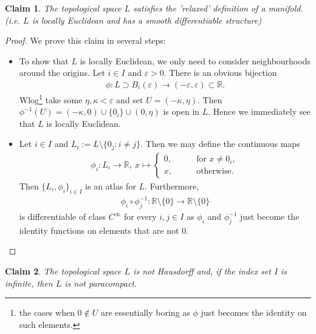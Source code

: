 \documentclass[a4paper, 12pt]{article}
\theoremstyle{iremark}
\newtheorem{claim}{Claim}
\newcommand{\R}{\mathbb{R}}
\begin{document}
\begin{claim}
    The topological space $L$ satisfies the 'relaxed' definition of a manifold. (i.e. $L$ is locally Euclidean and 
    has a smooth differentiable structure)
\end{claim}
\begin{proof}
    We prove this claim in several steps:
    \begin{itemize}
        \item To show that $L$ is locally Euclidean, we only need to consider neighbourhoods around the origins. 
		Let $i\in I$ and $\varepsilon > 0$. There is an obvious bijection
        \begin{align*}
            \phi\colon L\supset B_i(\varepsilon)\to (-\varepsilon,\varepsilon)\subset\R.
        \end{align*}
        Wlog\footnote{the cases when $0\notin U$ are essentially boring as $\phi$ just becomes the identity on such elements.} 
	take some $\eta, \kappa < \varepsilon$ and set $U = (-\kappa, \eta)$. 
	Then $\phi^{-1}(U) = (-\kappa, 0)\cup\{0_i\}\cup(0,\eta)$ is open in $L$. 
	Hence we immediately see that $L$ is locally Euclidean.
        \item Let $i\in I$ and $L_i := L\setminus\{0_j:i\neq j\}$. Then we may define the continuous maps
        \begin{align*}
            \phi_i\colon L_i\to\R,\ x\mapsto \begin{cases}
                0,\qquad&\text{for } x\neq 0_i,\\
                x,\qquad&\text{otherwise}.
            \end{cases}
        \end{align*}
        Then $\{L_i, \phi_i\}_{i\in I}$ is an atlas for $L$. Furthermore,
        \begin{align*}
            \phi_i\circ\phi_j^{-1}\colon \R\setminus\{0\}\to \R\setminus\{0\}
        \end{align*}
        is differentiable of class $C^{\infty}$ for every $i,j\in I$ as $\phi_i$ and $\phi_j^{-1}$ just 
	become the identity functions on elements that are not $0$.
    \end{itemize}
\end{proof}
\newpage
\begin{claim}
    The topological space $L$ is not Hausdorff and, if the index set $I$ is infinite, then $L$ is not paracompact.
\end{claim}
\end{document}

